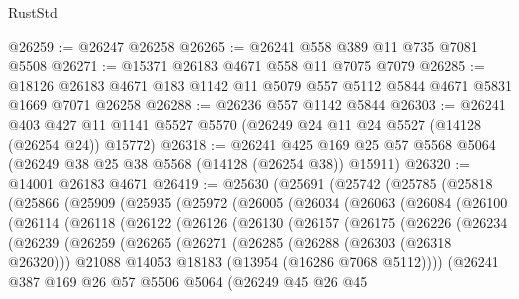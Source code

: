 \begin{lexlean}{RustStd}
\begin{coremodule}
@26259 := @26247 @26258
@26265 := @26241 @558 @389 @11 @735 @7081 @5508
@26271 := @15371 @26183 @4671 @558 @11 @7075 @7079
@26285 := @18126 @26183 @4671 @183 @1142 @11 @5079 @557 @5112 @5844 @4671 @5831 @1669 @7071 @26258
@26288 := @26236 @557 @1142 @5844
@26303 := @26241
    @403
    @427
    @11
    @1141
    @5527
    @5570
    (@26249 @24 @11 @24 @5527 (@14128 (@26254 @24)) @15772)
@26318 := @26241
    @425
    @169
    @25
    @57
    @5568
    @5064
    (@26249 @38 @25 @38 @5568 (@14128 (@26254 @38)) @15911)
@26320 := @14001 @26183 @4671
@26419 := @25630
    (@25691
      (@25742
        (@25785
          (@25818
            (@25866
              (@25909
                (@25935
                  (@25972
                    (@26005
                      (@26034
                        (@26063
                          (@26084
                            (@26100
                              (@26114
                                (@26118
                                  (@26122
                                    (@26126
                                      (@26130
                                        (@26157
                                          (@26175
                                            (@26226
                                              (@26234
                                                (@26239
                                                  (@26259
                                                    (@26265
                                                      (@26271
                                                        (@26285
                                                          (@26288 (@26303 (@26318 @26320)))
                                                          @21088
                                                          @14053
                                                          @18183
                                                          (@13954 (@16286 @7068 @5112))))
                                                      (@26241
                                                        @387
                                                        @169
                                                        @26
                                                        @57
                                                        @5506
                                                        @5064
                                                        (@26249
                                                          @45
                                                          @26
                                                          @45

\end{coremodule}
\end{lexlean}
